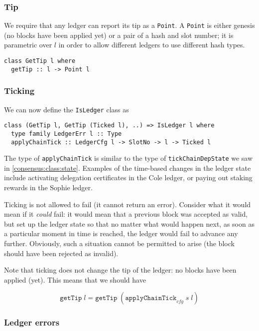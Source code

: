 \subsubsection{Tip}

We require that any ledger can report its tip as a \lstinline!Point!. A
\lstinline!Point! is either genesis (no blocks have been applied yet) or a pair
of a hash and slot number; it is parametric over $l$ in order to allow
different ledgers to use different hash types.
%
\begin{lstlisting}
class GetTip l where
  getTip :: l -> Point l
\end{lstlisting}

\subsubsection{Ticking}

We can now define the \lstinline!IsLedger! class as
%
\begin{lstlisting}
class (GetTip l, GetTip (Ticked l), ..) => IsLedger l where
  type family LedgerErr l :: Type
  applyChainTick :: LedgerCfg l -> SlotNo -> l -> Ticked l
\end{lstlisting}

The type of \lstinline!applyChainTick! is similar to the type of
\lstinline!tickChainDepState! we saw in \cref{consensus:class:state}.
Examples of the time-based changes in the ledger state include activating
delegation certificates in the Cole ledger, or paying out staking rewards
in the Sophie ledger.

Ticking is not allowed to fail (it cannot return an error). Consider what it
would mean if it \emph{could} fail: it would mean that a previous block was
accepted as valid, but set up the ledger state so that no matter what would
happen next, as soon as a particular moment in time is reached, the ledger would
fail to advance any further. Obviously, such a situation cannot be permitted to
arise (the block should have been rejected as invalid).

Note that ticking does not change the tip of the ledger: no blocks have been
applied (yet). This means that we should have

\begin{equation}
  \mathtt{getTip} \; l
= \mathtt{getTip} \; (\mathtt{applyChainTick}_\mathit{cfg} \; s \; l)
\end{equation}

\subsubsection{Ledger errors}

